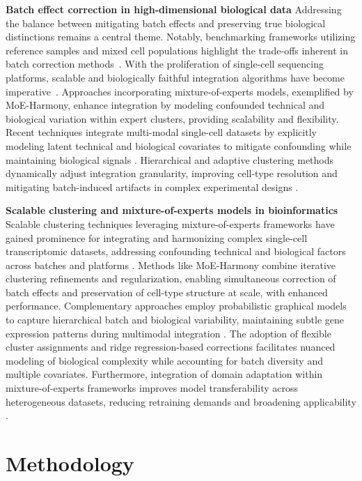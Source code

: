 \documentclass{article}
\begin{document}
\textbf{Batch effect correction in high-dimensional biological data} Addressing the balance between mitigating batch effects and preserving true biological distinctions remains a central theme. Notably, benchmarking frameworks utilizing reference samples and mixed cell populations highlight the trade-offs inherent in batch correction methods~\citep{Chen2020AMS}. With the proliferation of single-cell sequencing platforms, scalable and biologically faithful integration algorithms have become imperative~\citep{Gondal2024ASO}. Approaches incorporating mixture-of-experts models, exemplified by MoE-Harmony, enhance integration by modeling confounded technical and biological variation within expert clusters, providing scalability and flexibility. Recent techniques integrate multi-modal single-cell datasets by explicitly modeling latent technical and biological covariates to mitigate confounding while maintaining biological signals \citep{Butler2018IntegratingST,Wu2024SinglecellST}. Hierarchical and adaptive clustering methods dynamically adjust integration granularity, improving cell-type resolution and mitigating batch-induced artifacts in complex experimental designs \citep{Hicks2018MissingDA,Venkatasubramanian2019ResolvingSH}.

\textbf{Scalable clustering and mixture-of-experts models in bioinformatics} Scalable clustering techniques leveraging mixture-of-experts frameworks have gained prominence for integrating and harmonizing complex single-cell transcriptomic datasets, addressing confounding technical and biological factors across batches and platforms \citep{Mereu2020BenchmarkingSR,Arya2025NavigatingSR}. Methods like MoE-Harmony combine iterative clustering refinements and regularization, enabling simultaneous correction of batch effects and preservation of cell-type structure at scale, with enhanced performance. Complementary approaches employ probabilistic graphical models to capture hierarchical batch and biological variability, maintaining subtle gene expression patterns during multimodal integration \citep{Squair2021PrioritizationOC,Lun2016ASW}. The adoption of flexible cluster assignments and ridge regression-based corrections facilitates nuanced modeling of biological complexity while accounting for batch diversity and multiple covariates. Furthermore, integration of domain adaptation within mixture-of-experts frameworks improves model transferability across heterogeneous datasets, reducing retraining demands and broadening applicability \citep{Mandric2020BATMANFA}.

\section{Methodology}
\end{document}
